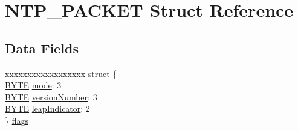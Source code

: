 \hypertarget{struct_n_t_p___p_a_c_k_e_t}{}\section{N\+T\+P\+\_\+\+P\+A\+C\+K\+E\+T Struct Reference}
\label{struct_n_t_p___p_a_c_k_e_t}
\subsection*{Data Fields}
\begin{DoxyCompactItemize}
\item 
\begin{tabbing}
xx\=xx\=xx\=xx\=xx\=xx\=xx\=xx\=xx\=\kill
struct \{\\
\>\hyperlink{_generic_type_defs_8h_a4ae1dab0fb4b072a66584546209e7d58}{BYTE} \hyperlink{struct_n_t_p___p_a_c_k_e_t_a4cd01e42a5504c3c394f8dab8f742ef1}{mode}: 3\\
\>\hyperlink{_generic_type_defs_8h_a4ae1dab0fb4b072a66584546209e7d58}{BYTE} \hyperlink{struct_n_t_p___p_a_c_k_e_t_a7487f860e8661c343c34fef877651c8f}{versionNumber}: 3\\
\>\hyperlink{_generic_type_defs_8h_a4ae1dab0fb4b072a66584546209e7d58}{BYTE} \hyperlink{struct_n_t_p___p_a_c_k_e_t_a700d2c16fa60fdc2df8ba1d4ca38d892}{leapIndicator}: 2\\
\} \hyperlink{struct_n_t_p___p_a_c_k_e_t_a1c08ad6e8c807f00f791faa1bb75bf91}{flags}\\


\end{tabbing}
\end{DoxyCompactItemize}
